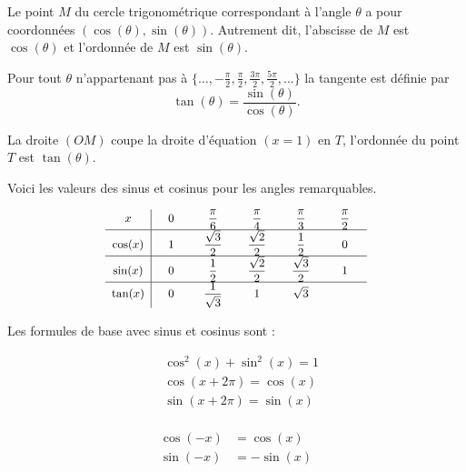 \documentclass[11pt,class=report,crop=false]{standalone}
\begin{document}
Le point $M$ du cercle trigonométrique correspondant à l'angle $\theta$ a pour coordonnées $(\cos(\theta),\sin(\theta))$.
Autrement dit, l'abscisse de $M$ est $\cos(\theta)$ et l'ordonnée de $M$ est $\sin(\theta)$.



Pour tout $\theta$ n'appartenant pas à $\{\ldots, -\frac\pi2, \frac\pi2, \frac{3\pi}{2}, \frac{5\pi}{2},\ldots  \}$
la tangente est définie par
$$\tan(\theta) = \frac{\sin(\theta)}{\cos(\theta)}.$$

La droite $(OM)$ coupe la droite d'équation $(x=1)$ en $T$,
l'ordonnée du point $T$ est $\tan(\theta)$.

Voici les valeurs des sinus et cosinus pour les angles remarquables.

\begin{center}
\begin{minipage}{0.4\textwidth}
{
\renewcommand{\arraystretch}{2.5}
$$\small 
\begin{array}{c|*{5}{c}}
	x     & \hphantom{X} 0 \hphantom{X} & \hphantom{X} \dfrac\pi6 \hphantom{X} &  \hphantom{X} \dfrac\pi 4 \hphantom{X}
	& \hphantom{X} \dfrac \pi 3 \hphantom{X} & \hphantom{X} \dfrac \pi 2 \hphantom{X} \\
	\hline
	\cos(x)   & 1 & \dfrac{\sqrt3}{2} & \dfrac{\sqrt2}{2} & \dfrac12 & 0 \\
	\hline
	\sin(x)   & 0 &\dfrac12 & \dfrac{\sqrt2}{2} & \dfrac{\sqrt3}{2} & 1\\
	\hline
	\tan(x)   & 0 & \dfrac{1}{\sqrt{3}} & 1 & \sqrt{3} &
\end{array}
$$
}
\end{minipage}\qquad\qquad\qquad
\begin{minipage}{0.4\textwidth}
\end{minipage}
\end{center}


Les formules de base avec sinus et cosinus sont :
\begin{center}
\begin{minipage}{0.4\textwidth}
\begin{align*}
	& \cos^2(x) + \sin^2(x) = 1 \\
	& \cos(x+2\pi)=\cos(x) \\
	& \sin(x+2\pi)=\sin(x) \\
\end{align*}
\end{minipage}\qquad
\begin{minipage}{0.4\textwidth}
\begin{align*}
	\cos (-x) &= \cos(x) \\
	\sin (-x) &= -\sin(x) \\
\end{align*}
\end{minipage}
\end{center}
\end{document}
